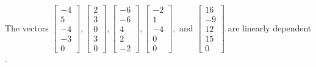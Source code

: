 \begin{exercise}
\begin{exerciseStatement}
  \end{exerciseStatement}
  \begin{exerciseAnswer}
   The vectors \(\left[\begin{array}{r}
-4 \\
5 \\
-4 \\
-3 \\
0
\end{array}\right] , \left[\begin{array}{r}
2 \\
3 \\
0 \\
3 \\
0
\end{array}\right] , \left[\begin{array}{r}
-6 \\
-6 \\
4 \\
2 \\
-2
\end{array}\right] , \left[\begin{array}{r}
-2 \\
1 \\
-4 \\
0 \\
0
\end{array}\right] , \text{ and } \left[\begin{array}{r}
16 \\
-9 \\
12 \\
15 \\
0
\end{array}\right]\) are 
  	 linearly dependent  .
  


  \end{exerciseAnswer}
\end{exercise}